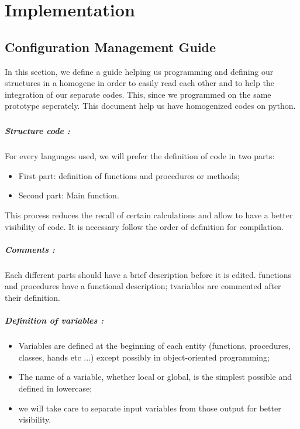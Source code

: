 \chapter{Implementation}

\section{Configuration Management Guide}
In this section, we define a guide helping us programming and defining our structures in a homogene in order to easily read each other and to help the integration of our separate codes. This, since we programmed on the same prototype seperately. This document help us have homogenized codes on python.
\paragraph{}


\paragraph{Structure code :} For every languages used, we will prefer the definition of code in two parts:
\begin{itemize}
\item First part: definition of functions and procedures or methods;
\item Second part: Main function.
\end{itemize}


This process reduces the recall of certain calculations and allow to have a better visibility of code. It is necessary follow the order of definition for compilation.


\paragraph{Comments :} Each different parts should have a brief description before it is edited.
functions and procedures have a functional description;
tvariables are commented after their definition.


\paragraph{Definition of variables :} 
\begin{itemize}
\item Variables are defined at the beginning of each entity (functions, procedures, classes, hands etc ...) except possibly in object-oriented programming;
\item The name of a variable, whether local or global, is the simplest possible and defined in lowercase;


\item we will take care to separate input variables from those output for better visibility.
\end{itemize}

